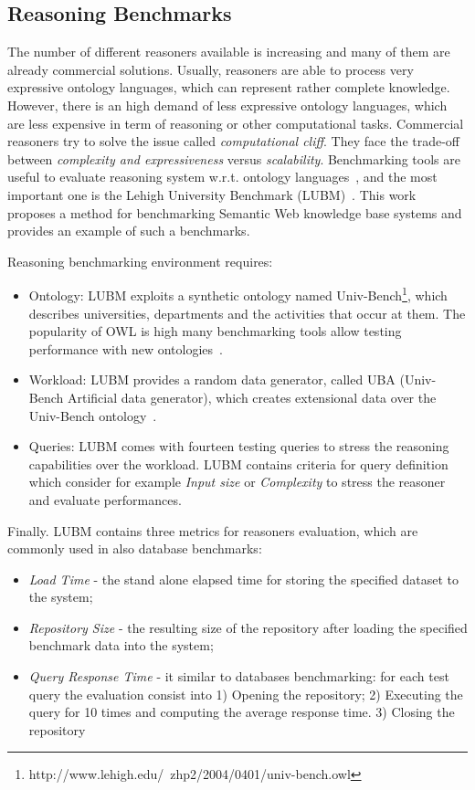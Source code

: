 \subsection{Reasoning Benchmarks}\label{sec:lubm}

The number of different reasoners available is increasing and many of them are already commercial solutions. Usually, reasoners are able to process very expressive ontology languages, which can represent rather complete knowledge. However, there is an high demand of less expressive ontology languages, which are less expensive in term of reasoning or other computational tasks. Commercial reasoners try to solve the issue called \textit{computational cliff}. They face the trade-off between \textit{complexity and expressiveness} versus \textit{scalability}. Benchmarking tools are useful to evaluate reasoning system w.r.t. ontology languages~\cite{bock2008benchmarking}, and the most important one is the Lehigh University Benchmark (LUBM)~\cite{Guo2005}. This work proposes a  method for benchmarking Semantic Web knowledge base systems and provides an example of such a benchmarks.

Reasoning benchmarking environment requires:
\begin{itemize}
\item Ontology: LUBM exploits a synthetic ontology named Univ-Bench\footnote{http://www.lehigh.edu/~zhp2/2004/0401/univ-bench.owl}, which describes universities, departments and the activities that occur at them. The popularity of OWL is high many benchmarking tools allow testing performance with new ontologies~\cite{gardiner2006automated}.

\item Workload: LUBM provides a random data generator, called UBA (Univ-Bench Artificial data generator), which creates extensional data over the Univ-Bench ontology~\cite{Guo2005}.

\item Queries: LUBM comes with fourteen testing queries to stress the reasoning capabilities over the workload. LUBM contains criteria for query definition which consider for example \textit{Input size} or \textit{Complexity} to stress the reasoner and evaluate performances.
\end{itemize}

Finally. LUBM contains three metrics for reasoners evaluation, which are commonly used in also database benchmarks:
\begin{itemize}
\item \textit{Load Time} - the stand alone elapsed time for storing the specified dataset to the system;
\item \textit{Repository Size} -  the resulting size of the repository after loading the specified benchmark data into the system;
\item \textit{Query Response Time} - it similar to databases benchmarking: for each test query the evaluation consist into
  	1) Opening the repository; 2) Executing the query for 10 times and computing the average response time. 3) Closing the repository
\end{itemize}

